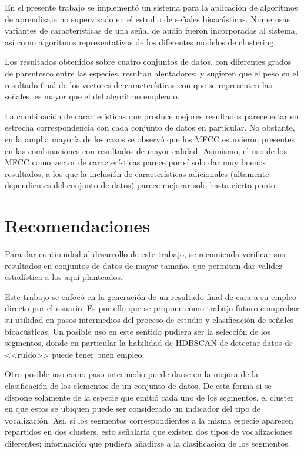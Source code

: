En el presente trabajo se implementó un sistema para la aplicación de algoritmos de aprendizaje no supervisado en el estudio de señales bioacústicas.
Numerosas variantes de características de una señal de audio fueron incorporadas al sistema, así como algoritmos representativos de los diferentes modelos de clustering.

Los resultados obtenidos sobre cuatro conjuntos de datos, con diferentes grados de parentesco entre las especies, resultan alentadores;
y sugieren que el peso en el resultado final de los vectores de características con que se representen las señales, es mayor que el del algoritmo empleado.

La combinación de características que produce mejores resultados parece estar en estrecha correspondencia con cada conjunto de datos en particular.
No obstante, en la amplia mayoría de los casos se observó que los MFCC estuvieron presentes en las combinaciones con resultados de mayor calidad.
Asimismo, el uso de los MFCC como vector de características parece por sí solo dar muy buenos resultados, a los que la inclusión de características adicionales (altamente dependientes del conjunto de datos) parece mejorar solo hasta cierto punto.

\section*{Recomendaciones}\label{sec:recomendaciones}

Para dar continuidad al desarrollo de este trabajo, se recomienda verificar sus resultados en conjuntos de datos de mayor tamaño, que permitan dar validez estadística a los aquí planteados.

Este trabajo se enfocó en la generación de un resultado final de cara a su empleo directo por el usuario.
Es por ello que se propone como trabajo futuro comprobar su utilidad en pasos intermedios del proceso de estudio y clasificación de señales bioacústicas.
Un posible uso en este sentido pudiera ser la selección de los segmentos, donde en particular la habilidad de HDBSCAN de detectar datos de <<ruido>> puede tener buen empleo.

Otro posible uso como paso intermedio puede darse en la mejora de la clasificación de los elementos de un conjunto de datos.
De esta forma si se dispone solamente de la especie que emitió cada uno de los segmentos, el cluster en que estos se ubiquen puede ser considerado un indicador del tipo de vocalización.
Así, si los segmentos correspondientes a la misma especie aparecen repartidos en dos clusters, esto señalaría que existen dos tipos de vocalizaciones diferentes;
información que pudiera añadirse a la clasificación de los segmentos.
